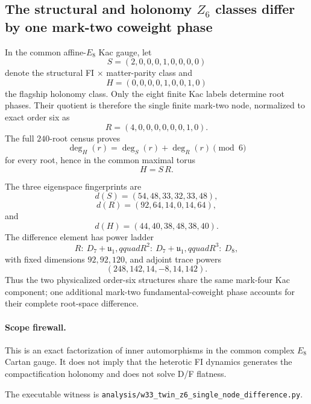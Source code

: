 \subsection*{The structural and holonomy $Z_6$ classes differ by one mark-two coweight phase}

In the common affine-$E_8$ Kac gauge, let
\[
S=(2,0,0,0,1,0,0,0,0)
\]
denote the structural FI $\times$ matter-parity class and
\[
H=(0,0,0,0,1,0,0,1,0)
\]
the flagship holonomy class.  Only the eight finite Kac labels determine root
phases.  Their quotient is therefore the single finite mark-two node,
normalized to exact order six as
\[
\boxed{R=(4,0,0,0,0,0,0,1,0)}.
\]
The full $240$-root census proves
\[
\boxed{\deg_H(r)=\deg_S(r)+\deg_R(r)\pmod6}
\]
for every root, hence in the common maximal torus
\[
\boxed{H=S\,R}.
\]

The three eigenspace fingerprints are
\[
d(S)=(54,48,33,32,33,48),
\]
\[
\boxed{d(R)=(92,64,14,0,14,64)},
\]
and
\[
d(H)=(44,40,38,48,38,40).
\]
The difference element has power ladder
\[
R:\ D_7+\mathfrak u_1,qquad
R^2:\ D_7+\mathfrak u_1,qquad
R^3:\ D_8,
\]
with fixed dimensions $92,92,120$, and adjoint trace powers
\[
(248,142,14,-8,14,142).
\]
Thus the two physicalized order-six structures share the same mark-four Kac
component; one additional mark-two fundamental-coweight phase accounts for
their complete root-space difference.

\paragraph{Scope firewall.}
This is an exact factorization of inner automorphisms in the common complex
$E_8$ Cartan gauge.  It does not imply that the heterotic FI dynamics
generates the compactification holonomy and does not solve D/F flatness.

The executable witness is
\texttt{analysis/w33\_twin\_z6\_single\_node\_difference.py}.
